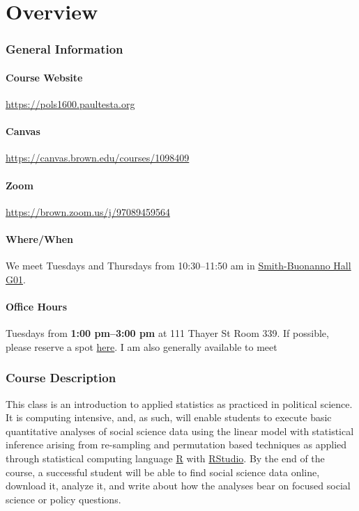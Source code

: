 
\part*{Overview}

\section{General Information}
\subsection{Course Website} \url{https://pols1600.paultesta.org}
\subsection{Canvas} \url{https://canvas.brown.edu/courses/1098409}
\subsection{Zoom} \url{https://brown.zoom.us/j/97089459564}
\subsection{Where/When}
We meet Tuesdays and Thursdays from 10:30--11:50 am in \href{https://brown.edu/Facilities/Facilities_Management/maps/index.php#building/SMITH-BUON}{Smith-Buonanno Hall G01}.

\subsection{Office Hours}
 Tuesdays from \textbf{1:00 pm--3:00 pm} at 111 Thayer St Room 339. If possible, please reserve a spot \href{https://calendar.app.google/31gV2U8fHNmv9LsV6}{here}. I am also generally available to meet 

\section{Course Description}

This class is an introduction to applied statistics as practiced in political science. It is computing intensive, and, as such, will enable students to execute basic quantitative analyses of social science data using the linear model with statistical inference arising from re-sampling and permutation based techniques as applied through statistical computing language \href{https://cran.r-project.org/}{R} with \href{https://www.rstudio.com/}{RStudio}. By the end of the course, a successful student will be able to find social science data online, download it, analyze it, and write about how the analyses bear on focused social science or policy questions.



